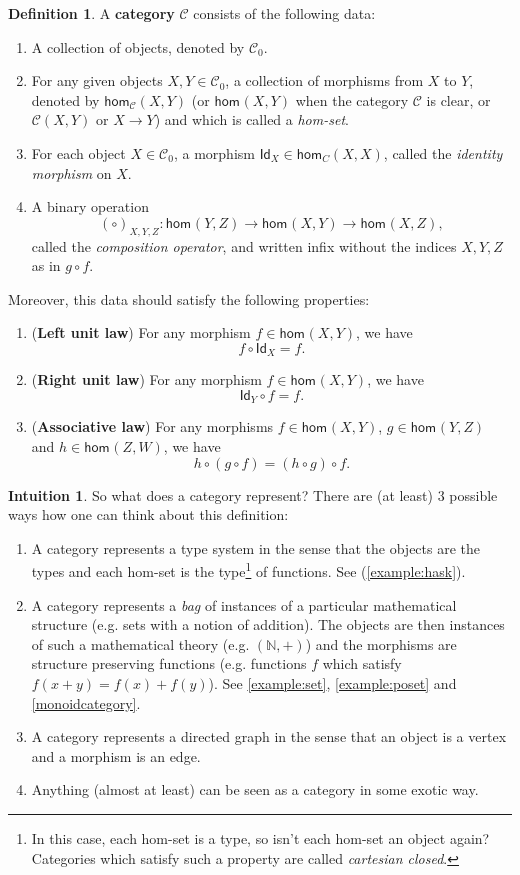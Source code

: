 \documentclass[a4paper,10pt]{scrartcl}
\theoremstyle{plain}
\theoremstyle{definition}
\newtheorem{dfn}[thm]{Definition}
\newtheorem{intu}[thm]{Intuition}
\newcommand{\cfont}[1]{\ensuremath{\mathsf{#1}}}
\newcommand{\Cat}[1]{\mathcal{#1}}
\newcommand{\CC}{\Cat{C}}
\newcommand{\Ob}[1]{{#1}_0}
\newcommand{\Hom}[3][]{\cfont{hom}_{#1}(#2,#3)}
\newcommand{\CHom}[3]{{#1}(#2,#3)}
\newcommand{\Id}[1][]{\cfont{Id}_{#1}}
\newcommand{\co}[2]{\ensuremath{#2 \circ #1}}
\begin{document}
\begin{dfn} A \textbf{category} $\CC$ consists of the following data:
\begin{enumerate}
\item A collection of objects, denoted by $\Ob{\CC}$.
\item For any given objects $X,Y \in \Ob{\CC}$, a collection of morphisms from $X$ to $Y$, denoted by $\Hom[\CC]{X}{Y}$ (or $\Hom{X}{Y}$ when the category $\CC$ is clear, or $\CHom \CC X Y$ or $X \to Y$) and which is called a \textit{hom-set}.
\item For each object $X\in \Ob{\CC}$, a morphism $\Id[X] \in \Hom[C]{X}{X}$, called the \textit{identity morphism} on $X$.
\item A binary operation
\[
(\co{}{})_{X,Y,Z} : \Hom{Y}{Z} \to \Hom X Y \to \Hom X Z,
\]
called the \textit{composition operator}, and written infix without the indices $X,Y,Z$ as in $\co{f}{g}$.
\end{enumerate}
Moreover, this data should satisfy the following properties:
\begin{enumerate}
\item (\textbf{Left unit law}) For any morphism $f \in \Hom X Y$, we have 
\[
 \co{\Id[X]} {f} = f.
\]
\item (\textbf{Right unit law}) For any morphism $f \in \Hom X Y$, we have 
\[
  \co f {\Id[Y]} = f.
\]
\item (\textbf{Associative law}) For any morphisms $f\in \Hom X Y$, $g\in \Hom Y Z$ and $h\in \Hom Z W$, we have
\[
     \co {(\co f g)}{h} =  \co f {(\co g  h)}.
\]
\end{enumerate}
\end{dfn}

\begin{intu} So what does a category represent? There are (at least) $3$ possible ways how one can think about this definition:
\begin{enumerate}
\item A category represents a type system in the sense that the objects are the types and each hom-set is the type\footnote{In this case, each hom-set is a type, so isn't each hom-set an object again? Categories which satisfy such a property are called \textit{cartesian closed}.} of functions. See (\cref{example:hask}).
\item A category represents a \textit{bag} of instances of a particular mathematical structure (e.g. sets with a notion of addition). The objects are then instances of such a mathematical theory (e.g. $(\mathbb{N},+)$) and the morphisms are structure preserving functions (e.g. functions $f$ which satisfy $f(x+y) = f(x) + f(y)$). See \cref{example:set}, \cref{example:poset} and \cref{monoidcategory}.
\item A category represents a directed graph in the sense that an object is a vertex and a morphism is an edge.
\item Anything (almost at least) can be seen as a category in some exotic way. 
\end{enumerate}
\end{intu}
\end{document}
